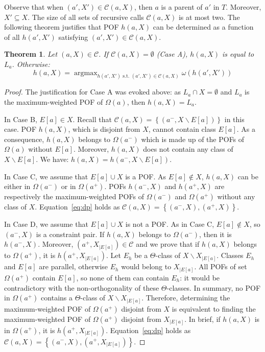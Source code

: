 \documentclass{article}
\DeclareMathOperator*{\argmax}{argmax}
\newtheorem{theorem}{Theorem}
\newcommand{\set}[1]{\left\{ #1 \right\}}
\begin{document}
Observe that when $(a',X') \in \mathcal{C}(a,X)$, then $a$ is a parent of $a'$ in $T$. Moreover, $X' \subseteq X$. The size of all sets of recursive calls $\mathcal{C}(a,X)$ is at most two.
The following theorem justifies that POF $h(a,X)$ can be determined as a function of all $h(a',X')$ satisfying $(a',X') \in \mathcal{C}(a,X)$.

\begin{theorem}
Let $(a,X) \in \mathcal{C}$. If $\mathcal{C}(a,X) = \emptyset$ (Case A), $h(a,X)$ is equal to $L_a$. Otherwise:
\begin{equation}
h(a,X) = \argmax_{h(a',X') \mbox{~s.t.~} (a',X') \in \mathcal{C}(a,X)} \omega\left(h(a',X')\right)
\label{eq:dp}
\end{equation}
\label{th:dp_pairs}
\end{theorem}
\begin{proof}
The justification for Case A was evoked above: as $L_a \cap X = \emptyset$ and $L_a$ is the maximum-weighted POF of $\Omega(a)$, then $h(a,X) = L_a$.

In Case B, $E\left[a\right] \in X$. Recall that $\mathcal{C}(a,X) = \set{(a^-,X\backslash E\left[a\right])}$ in this case. POF $h(a,X)$, which is disjoint from $X$, cannot contain class $E\left[a\right]$. As a consequence, $h(a,X)$ belongs to $\Omega(a^-)$ which is made up of the POFs of $\Omega(a)$ without $E\left[a\right]$. Moreover, $h(a,X)$ does not contain any class of $X\backslash E\left[a\right]$. We have: $h(a,X) = h(a^-,X\backslash E\left[a\right])$.

In Case C, we assume that $E\left[a\right] \cup X$ is a POF. As $E\left[a\right] \notin X$, $h(a,X)$ can be either in $\Omega(a^-)$ or in $\Omega(a^+)$. POFs $h(a^-,X)$ and $h(a^+,X)$ are respectively the maximum-weighted POFs of $\Omega(a^-)$ and $\Omega(a^+)$ without any class of $X$. Equation~\eqref{eq:dp} holds as $\mathcal{C}(a,X) = \set{(a^-,X),(a^+,X)}$.

In Case D, we assume that $E\left[a\right] \cup X$ is not a POF. As in Case C, $E\left[a\right] \notin X$, so $(a^-,X)$ is a constraint pair. If $h(a,X)$ belongs to $\Omega(a^-)$, then it is $h(a^-,X)$. Moreover, $(a^+,X_{|E[a]})\in \mathcal{C}$ and we prove that if $h(a,X)$ belongs to $\Omega(a^+)$, it is $h(a^+,X_{|E[a]})$. Let $E_h$ be a $\Theta$-class of $X\backslash X_{|E[a]}$. Classes $E_h$ and $E\left[a\right]$ are parallel, otherwise $E_h$ would belong to $X_{|E[a]}$. All POFs of set $\Omega(a^+)$ contain $E\left[a\right]$, so none of them can contain $E_h$: it would be contradictory with the non-orthogonality of these $\Theta$-classes. In summary, no POF in $\Omega(a^+)$ contains a $\Theta$-class of $X\backslash X_{|E[a]}$. Therefore, determining the maximum-weighted POF of $\Omega(a^+)$ disjoint from $X$ is equivalent to finding the maximum-weighted POF  of $\Omega(a^+)$ disjoint from $X_{|E[a]}$. In brief, if $h(a,X)$ is in $\Omega(a^+)$, it is $h(a^+,X_{|E[a]})$. Equation~\eqref{eq:dp} holds as $\mathcal{C}(a,X) = \set{(a^-,X),(a^+,X_{|E[a]})}$.
\end{proof}
\end{document}
